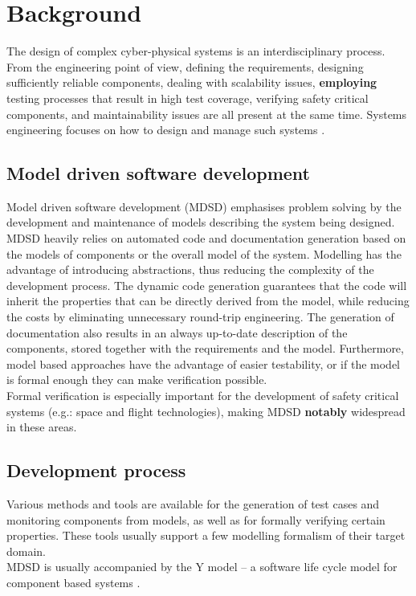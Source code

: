 %

\chapter{Background}
\label{chap:background}

The design of complex cyber-physical systems is an interdisciplinary process. From the engineering point of view, defining the requirements, designing sufficiently reliable components, dealing with scalability issues, \textbf{employing} testing processes that result in high test coverage, verifying safety critical components, and maintainability issues are all present at the same time. Systems engineering focuses on how to design and manage such systems \cite{randomwikipedialink1} \cite{randomwikipedialink2}. 
\section{Model driven software development}
Model driven software development (MDSD) emphasises problem solving by the development and maintenance of models describing the system being designed. MDSD heavily relies on automated code and documentation generation based on the models of components or the overall model of the system. Modelling has the advantage of introducing abstractions, thus reducing the complexity of the development process. The dynamic code generation guarantees that the code will inherit the properties that can be directly derived from the model, while reducing the costs by eliminating unnecessary round-trip engineering. The generation of documentation also results in an always up-to-date description of the components, stored together with the requirements and the model. Furthermore, model based approaches have the advantage of easier testability, or if the model is formal enough they can make verification possible.\\
Formal verification is especially important for the development of safety critical systems (e.g.: space and flight technologies), making MDSD \textbf{notably} widespread in these areas.
\section{Development process}
Various methods and tools are available for the generation of test cases and monitoring components from models, as well as for formally verifying certain properties. These tools usually support a few modelling formalism of their target domain.\\
MDSD is usually accompanied by the Y model -- a software life cycle model for component based systems \cite{ymodel}.
